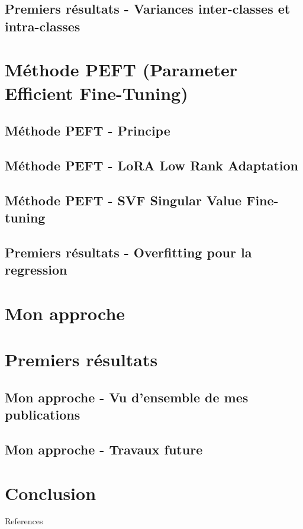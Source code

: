 \documentclass[xcolor=table, 8pt]{beamer}
\begin{document}
    \subsection{Premiers résultats - Variances inter-classes et intra-classes}\label{subsec:results-variances}
    
    
    

    \section{Méthode PEFT (Parameter Efficient Fine-Tuning)}\label{sec:peft}

    \subsection{Méthode PEFT - Principe}\label{subsec:peft-principle}

    \subsection{Méthode PEFT - LoRA Low Rank Adaptation}\label{subsec:peft-lora}
    

    \subsection{Méthode PEFT - SVF Singular Value Fine-tuning}\label{subsec:peft-svf}
    

    \subsection{Premiers résultats - Overfitting pour la regression}\label{subsec:results-loracurves}
    

    \section{Mon approche}\label{sec:approach}


    \section{Premiers résultats}\label{sec:results}




    \subsection{Mon approche - Vu d'ensemble de mes publications}\label{subsec:approach-publications}
    

    \subsection{Mon approche - Travaux future}\label{subsec:approach-future-work}
    
    \section{Conclusion}
    


    \begin{frame}[allowframebreaks=]{References}
        \printbibliography
    \end{frame}
\end{document}
